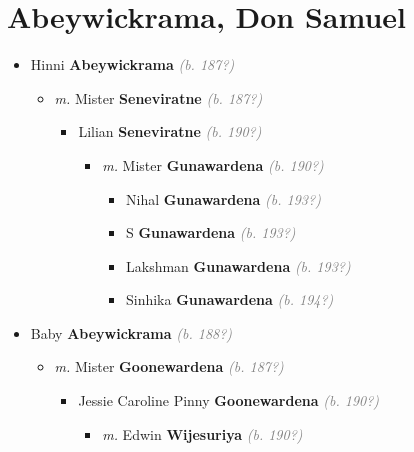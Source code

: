 \documentclass[10pt, openany]{book}
\begin{document}
\chapter{Abeywickrama, Don Samuel}
\label{00000024}
\textcolor{slmaroon}{\textit{}}
\begin{itemize}
\item{Hinni \textbf{Abeywickrama} \textcolor{gray}{\textit{(b. 187?)}}
\begin{itemize}
\item{\textit{m.} Mister \textbf{Seneviratne} \textcolor{gray}{\textit{(b. 187?)}}   \label{couple:00000036:00000826} \begin{itemize}
\item{Lilian \textbf{Seneviratne} \textcolor{gray}{\textit{(b. 190?)}}
\begin{itemize}
\item{\textit{m.} Mister \textbf{Gunawardena} \textcolor{gray}{\textit{(b. 190?)}}   \label{couple:00000245:00000824} \begin{itemize}
\item{Nihal \textbf{Gunawardena} \textcolor{gray}{\textit{(b. 193?)}}
 }
\item{S \textbf{Gunawardena} \textcolor{gray}{\textit{(b. 193?)}}
 }
\item{Lakshman \textbf{Gunawardena} \textcolor{gray}{\textit{(b. 193?)}}
 }
\item{Sinhika \textbf{Gunawardena} \textcolor{gray}{\textit{(b. 194?)}}
 }
\end{itemize}}
\end{itemize}
 }
\end{itemize}}
\end{itemize}
 }
\item{Baby \textbf{Abeywickrama} \textcolor{gray}{\textit{(b. 188?)}}
\begin{itemize}
\item{\textit{m.} Mister \textbf{Goonewardena} \textcolor{gray}{\textit{(b. 187?)}}   \label{couple:00000016:00000204} \begin{itemize}
\item{Jessie Caroline Pinny \textbf{Goonewardena} \textcolor{gray}{\textit{(b. 190?)}}
\begin{itemize}
\item{\textit{m.} Edwin \textbf{Wijesuriya} \textcolor{gray}{\textit{(b. 190?)}}   \label{couple:00000203:00001011} \begin{itemize}

\end{itemize}}
\end{itemize}}
\end{itemize}}
\end{itemize}}
\end{itemize}
\end{document}
